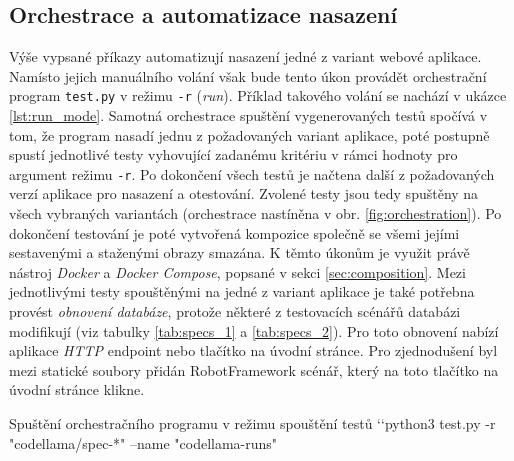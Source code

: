 \documentclass[czech, ma, kiv, he, iso690alph, pdf, viewonly]{fasthesis}
\begin{document}
    \subsection{Orchestrace a automatizace nasazení} \label{sec:orchestration}

    Výše vypsané příkazy automatizují nasazení jedné z variant webové aplikace. Namísto jejich manuálního volání však bude tento úkon provádět orchestrační program \verb|test.py| v režimu \verb|-r| (\textit{run}). Příklad takového volání se nachází v ukázce \ref{lst:run_mode}. Samotná orchestrace spuštění vygenerovaných testů spočívá v tom, že program nasadí jednu z požadovaných variant aplikace, poté postupně spustí jednotlivé testy vyhovující zadanému kritériu v rámci hodnoty pro argument režimu \verb|-r|. Po dokončení všech testů je načtena další z požadovaných verzí aplikace pro nasazení a otestování. Zvolené testy jsou tedy spuštěny na všech vybraných variantách (orchestrace nastíněna v obr. \ref{fig:orchestration}). Po dokončení testování je poté vytvořená kompozice společně se všemi jejími sestavenými a staženými obrazy smazána. K těmto úkonům je využit právě nástroj \textit{Docker} a \textit{Docker Compose}, popsané v sekci \ref{sec:composition}. Mezi jednotlivými testy spouštěnými na jedné z variant aplikace je také potřebna provést \textit{obnovení databáze}, protože některé z testovacích scénářů databázi modifikují (viz tabulky \ref{tab:specs_1} a \ref{tab:specs_2}). Pro toto obnovení nabízí aplikace \textit{HTTP} endpoint nebo tlačítko na úvodní stránce. Pro zjednodušení byl mezi statické soubory přidán RobotFramework scénář, který na toto tlačítko na úvodní stránce klikne.

    \begin{console}{Spuštění orchestračního programu v režimu spouštění testů \label{lst:run_mode}}
`\uxprompt`python3 test.py -r "codellama/spec-*" --name "codellama-runs"
    \end{console}
\end{document}
